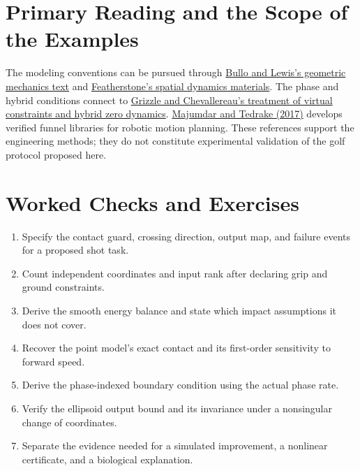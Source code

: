 \documentclass[12pt, openany]{book}
\theoremstyle{plain}
\begin{document}
\begin{samepage}
\section{Primary Reading and the Scope of the Examples}

The modeling conventions can be pursued through \href{https://motion.me.ucsb.edu/book-gcms/}{Bullo and Lewis's geometric mechanics text} and \href{https://royfeatherstone.org/teaching/index.html}{Featherstone's spatial dynamics materials}. The phase and hybrid conditions connect to \href{https://grizzle.robotics.umich.edu/files/HZD_HandbookApril2015.pdf}{Grizzle and Chevallereau's treatment of virtual constraints and hybrid zero dynamics}. \href{https://doi.org/10.1177/0278364917712421}{Majumdar and Tedrake (2017)} develops verified funnel libraries for robotic motion planning. These references support the engineering methods; they do not constitute experimental validation of the golf protocol proposed here.

\section{Worked Checks and Exercises}

\begin{enumerate}[itemsep=0.25em,parsep=0pt]
\item Specify the contact guard, crossing direction, output map, and failure events for a proposed shot task.
\item Count independent coordinates and input rank after declaring grip and ground constraints.
\item Derive the smooth energy balance and state which impact assumptions it does not cover.
\item Recover the point model's exact contact and its first-order sensitivity to forward speed.
\item Derive the phase-indexed boundary condition using the actual phase rate.
\item Verify the ellipsoid output bound and its invariance under a nonsingular change of coordinates.
\item Separate the evidence needed for a simulated improvement, a nonlinear certificate, and a biological explanation.
\end{enumerate}
\end{samepage}
\clearpage
\endgroup
\end{document}
